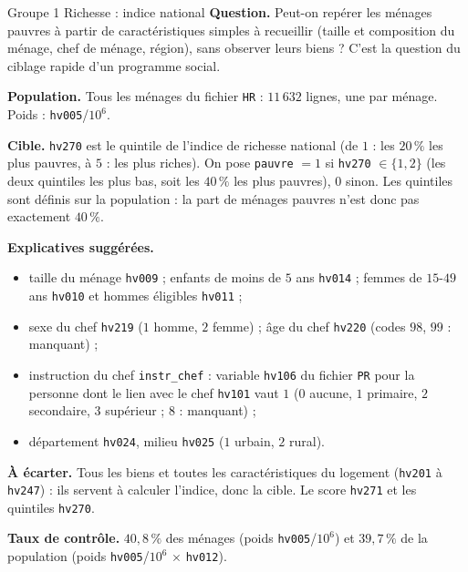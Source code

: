 \documentclass[11pt]{article}
\begin{document}
\begin{fiche}{Groupe 1 \textendash{} Richesse : indice national}
\textbf{Question.} Peut-on repérer les ménages pauvres à partir de caractéristiques simples à recueillir (taille et composition du ménage, chef de ménage, région), sans observer leurs biens ? C'est la question du ciblage rapide d'un programme social.

\textbf{Population.} Tous les ménages du fichier \texttt{HR} : $11\,632$ lignes, une par ménage. Poids : \texttt{hv005}/$10^6$.

\textbf{Cible.} \texttt{hv270} est le quintile de l'indice de richesse national (de $1$ : les $20\,\%$ les plus pauvres, à $5$ : les plus riches). On pose \texttt{pauvre} $=1$ si \texttt{hv270} $\in\{1,2\}$ (les deux quintiles les plus bas, soit les $40\,\%$ les plus pauvres), $0$ sinon. Les quintiles sont définis sur la population : la part de ménages pauvres n'est donc pas exactement $40\,\%$.

\textbf{Explicatives suggérées.}
\begin{itemize}
  \item taille du ménage \texttt{hv009} ; enfants de moins de $5$ ans \texttt{hv014} ; femmes de $15$-$49$ ans \texttt{hv010} et hommes éligibles \texttt{hv011} ;
  \item sexe du chef \texttt{hv219} ($1$ homme, $2$ femme) ; âge du chef \texttt{hv220} (codes $98$, $99$ : manquant) ;
  \item instruction du chef \texttt{instr\_chef} : variable \texttt{hv106} du fichier \texttt{PR} pour la personne dont le lien avec le chef \texttt{hv101} vaut $1$ ($0$ aucune, $1$ primaire, $2$ secondaire, $3$ supérieur ; $8$ : manquant) ;
  \item département \texttt{hv024}, milieu \texttt{hv025} ($1$ urbain, $2$ rural).
\end{itemize}

\textbf{À écarter.} Tous les biens et toutes les caractéristiques du logement (\texttt{hv201} à \texttt{hv247}) : ils servent à calculer l'indice, donc la cible. Le score \texttt{hv271} et les quintiles \texttt{hv270}.

\textbf{Taux de contrôle.} $40{,}8\,\%$ des ménages (poids \texttt{hv005}/$10^6$) et $39{,}7\,\%$ de la population (poids \texttt{hv005}/$10^6$ $\times$ \texttt{hv012}).


\end{fiche}
\end{document}
